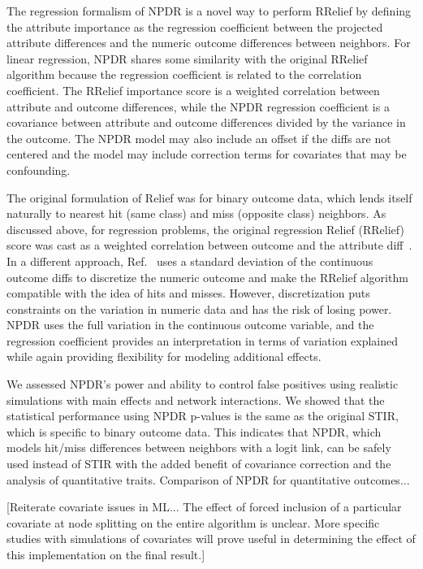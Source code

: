 \documentclass[10pt]{article}
\begin{document}
The regression formalism of NPDR is a novel way to perform RRelief by defining the attribute importance as the regression coefficient between the projected attribute differences and the numeric outcome differences between neighbors.  For linear regression, NPDR shares some similarity with the original RRelief algorithm because the regression coefficient is related to the correlation coefficient. The RRelief importance score is a weighted correlation between attribute and outcome differences, while the NPDR regression coefficient is a covariance between attribute and outcome differences divided by the variance in the outcome. The NPDR model may also include an offset if the diffs are not centered and the model may include correction terms for covariates that may be confounding. 

The original formulation of Relief was for binary outcome data, which lends itself naturally to nearest hit (same class) and miss (opposite class) neighbors. As discussed above, for regression problems, the original regression Relief (RRelief) score was cast as a weighted correlation between outcome and the attribute diff~\cite{robnik03}. In a different approach, Ref.~\cite{urbanowicz17} uses a standard deviation of the continuous outcome diffs to discretize the numeric outcome and make the RRelief algorithm compatible with the idea of hits and misses. However, discretization puts constraints on the variation in numeric data and has the risk of losing power. NPDR uses the full variation in the continuous outcome variable, and the regression coefficient provides an interpretation in terms of variation explained while again providing flexibility for modeling additional effects. 

We assessed NPDR's power and ability to control false positives using realistic simulations with main effects and network interactions. We showed that the statistical performance using NPDR p-values is the same as the original STIR, which is specific to binary outcome data. This indicates that NPDR, which models hit/miss differences between neighbors with a logit link, can be safely used instead of STIR with the added benefit of covariance correction and the analysis of quantitative traits. Comparison of NPDR for quantitative outcomes... 

[Reiterate covariate issues in ML... The effect of forced inclusion of a particular covariate at node splitting on the entire algorithm is unclear.
More specific studies with simulations of covariates will prove useful in determining the effect of this implementation on the final result.]
\end{document}
